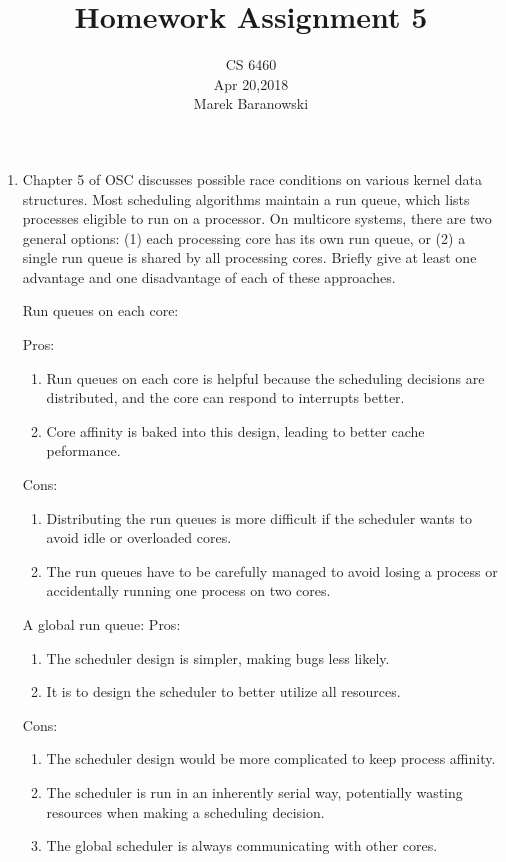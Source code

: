 \documentclass[a4paper, 11pt]{exam}
\title{Homework Assignment 5}
\subtitle{CS 6460\\
Apr 20,2018\\
Marek Baranowski}
\begin{document}
\maketitle
\begin{enumerate}
\item Chapter 5 of OSC discusses possible race conditions on various
  kernel data structures. Most scheduling algorithms maintain a run
  queue, which lists processes eligible to run on a processor. On
  multicore systems, there are two general options: (1) each
  processing core has its own run queue, or (2) a single run queue is
  shared by all processing cores. Briefly give at least one advantage
  and one disadvantage of each of these approaches.

Run queues on each core:

Pros:
\begin{enumerate}
\item Run queues on each core is helpful because the scheduling
  decisions are distributed, and the core can respond to interrupts
  better.
\item Core affinity is baked into this design, leading to better cache
  peformance.
\end{enumerate}
Cons:
\begin{enumerate}
\item Distributing the run queues is more difficult if the scheduler
  wants to avoid idle or overloaded cores.
\item The run queues have to be carefully managed to avoid losing a
  process or accidentally running one process on two cores.
\end{enumerate}

A global run queue:
Pros:
\begin{enumerate}
\item The scheduler design is simpler, making bugs less likely.
\item It is to design the scheduler to better utilize all resources.
\end{enumerate}

Cons:
\begin{enumerate}
\item The scheduler design would be more complicated to keep process
affinity.
\item The scheduler is run in an inherently serial way, potentially
wasting resources when making a scheduling decision.
\item The global scheduler is always communicating with other cores.
\end{enumerate}


\end{enumerate}
\end{document}
